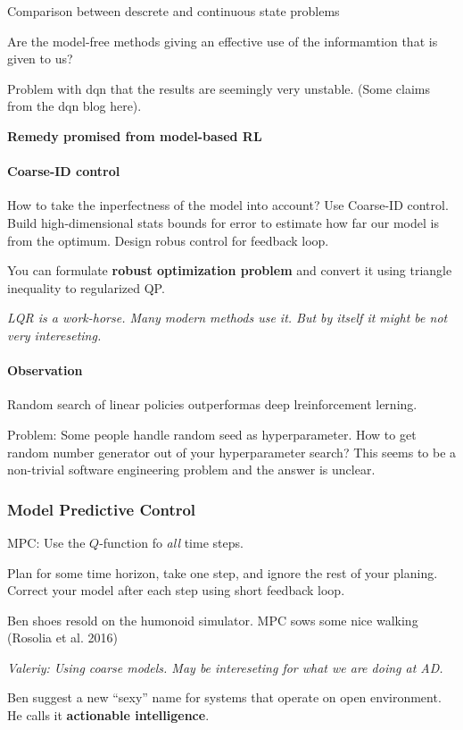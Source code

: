 \documentclass[11pt,oneside,a4paper]{scrartcl}
\newcommand{\valeriy}[1]{{\color{blue}\textit{Valeriy: #1}}}
\begin{document}
Comparison between descrete and continuous state problems

Are the model-free methods giving an effective use of the informamtion
that is given to us?


Problem with dqn that the results are seemingly very unstable. (Some
claims from the dqn blog here).

\textbf{Remedy promised from model-based RL}


\paragraph{Coarse-ID control} How to take the inperfectness of the model into account? Use Coarse-ID control.
Build high-dimensional stats bounds for error to estimate how far our
model is from the optimum. Design robus control for feedback loop.


You can formulate \textbf{robust optimization problem} and convert it using
triangle inequality to regularized QP.

\emph{LQR is a work-horse. Many modern methods use it. But by itself it
  might be not very intereseting.}

\paragraph{Observation} Random search of linear policies outperformas deep lreinforcement
lerning.

Problem: Some people handle random seed as hyperparameter. How to get
random number generator out of your hyperparameter search? This seems
to be a non-trivial software engineering problem and the answer is unclear.

\subsubsection{Model Predictive Control}
\label{sec:model-pred-contr}

MPC: Use the $Q$-function fo \emph{all} time steps.

Plan for some time horizon, take one step, and ignore the rest of your
planing. Correct your model after each step using short feedback loop.

Ben shoes resold on the humonoid simulator. MPC sows some nice walking
(Rosolia et al. 2016)

\valeriy{Using coarse models. May be intereseting for what we are
  doing at AD.}

Ben suggest a new ``sexy'' name for systems that operate on open
environment. He calls it \textbf{actionable intelligence}.
\end{document}
